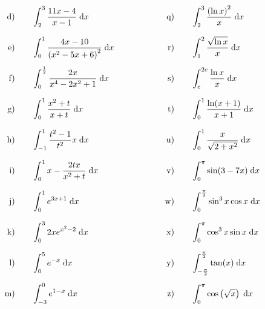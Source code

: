 \begin{exercise}
\begin{alignat*}{5}
        \text{d)\vstrut}&\quad & \excd & \separator & \text{q)\vstrut}&\quad & \excq \\
        \text{e)\vstrut}&\quad & \exce & \separator & \text{r)\vstrut}&\quad & \excr \\
        \text{f)\vstrut}&\quad & \excf & \separator & \text{s)\vstrut}&\quad & \excs \\
        \text{g)\vstrut}&\quad & \excg & \separator & \text{t)\vstrut}&\quad & \exct \\
        \text{h)\vstrut}&\quad & \exch & \separator & \text{u)\vstrut}&\quad & \excu \\
        \text{i)\vstrut}&\quad & \exci & \separator & \text{v)\vstrut}&\quad & \excv \\
        \text{j)\vstrut}&\quad & \excj & \separator & \text{w)\vstrut}&\quad & \excw \\
        \text{k)\vstrut}&\quad & \exck & \separator & \text{x)\vstrut}&\quad & \excx \\
        \text{l)\vstrut}&\quad & \excl & \separator & \text{y)\vstrut}&\quad & \excy \\
        \text{m)\vstrut}&\quad & \excm & \separator & \text{z)\vstrut}&\quad & \excz
      \end{alignat*}
    \endgroup
  \fi
\end{exercise}
